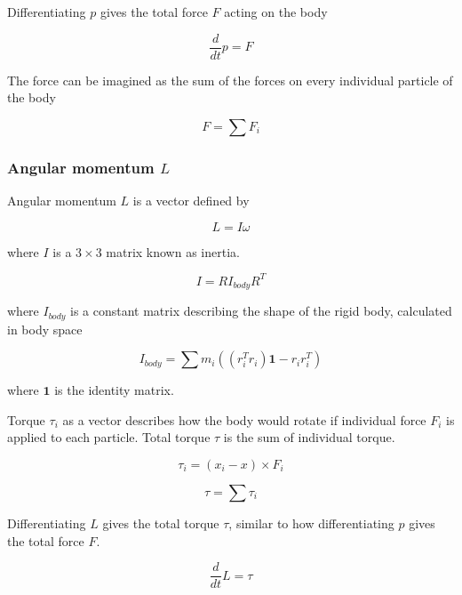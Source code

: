 \documentclass[runningheads]{llncs}
\begin{document}
Differentiating $p$ gives the total force $F$ acting on the body

\begin{equation}
\frac{d}{dt} p = F
\end{equation}

The force can be imagined as the sum of the forces on every individual particle of the body

\begin{equation}
F = \sum F_i
\end{equation}

\subsubsection{Angular momentum $L$} 

Angular momentum $L$ is a vector defined by

\begin{equation}
L = I \omega
\end{equation}

where $I$ is a $3\times 3$ matrix known as inertia.

\begin{equation}
I = R I_{body} R^T
\end{equation}

where $I_{body}$ is a constant matrix describing the shape of the rigid body, calculated in body space
    
\begin{equation}
I_{body} = \sum m_i((r_i^T r_i)\textbf{1} - r_i r_i^T)
\end{equation}

where $\textbf{1}$ is the identity matrix.

Torque $\tau_i$ as a vector describes how the body would rotate if individual force $F_i$ is applied to each particle. Total torque $\tau$ is the sum of individual torque.

\begin{equation}
\tau_i = (x_i - x) \times F_i
\end{equation}

\begin{equation}
\tau = \sum \tau_i
\end{equation}

Differentiating $L$ gives the total torque $\tau$, similar to how differentiating $p$ gives the total force $F$.

\begin{equation}
\frac{d}{dt} L = \tau
\end{equation}
\end{document}
